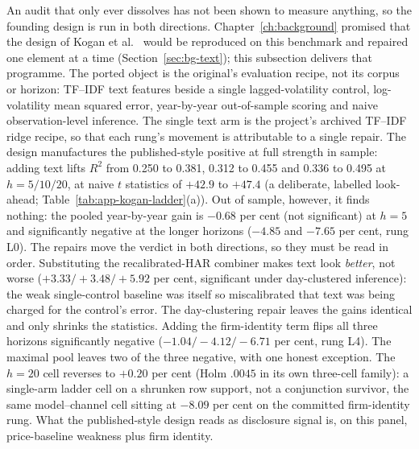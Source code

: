 An audit that only ever dissolves has not been shown to measure anything, so the founding design is run in both directions. Chapter~\ref{ch:background} promised that the design of Kogan et al.~\cite{kogan2009predicting} would be reproduced on this benchmark and repaired one element at a time (Section~\ref{sec:bg-text}); this subsection delivers that programme. The ported object is the original's evaluation recipe, not its corpus or horizon: TF--IDF text features beside a single lagged-volatility control, log-volatility mean squared error, year-by-year out-of-sample scoring and naive observation-level inference. The single text arm is the project's archived TF--IDF ridge recipe, so that each rung's movement is attributable to a single repair. %
The design manufactures the published-style positive at full strength in sample: adding text lifts $R^2$ from 0.250 to 0.381, 0.312 to 0.455 and 0.336 to 0.495 at $h{=}5/10/20$, at naive $t$ statistics of $+42.9$ to $+47.4$ (a deliberate, labelled look-ahead; Table~\ref{tab:app-kogan-ladder}(a)). %
Out of sample, however, it finds nothing: the pooled year-by-year gain is $-0.68$ per cent (not significant) at $h{=}5$ and significantly negative at the longer horizons ($-4.85$ and $-7.65$ per cent, rung L0). %
The repairs move the verdict in both directions, so they must be read in order. Substituting the recalibrated-HAR combiner makes text look \emph{better}, not worse ($+3.33/+3.48/+5.92$ per cent, significant under day-clustered inference): the weak single-control baseline was itself so miscalibrated that text was being charged for the control's error. The day-clustering repair leaves the gains identical and only shrinks the statistics. %
Adding the firm-identity term flips all three horizons significantly negative ($-1.04/-4.12/-6.71$ per cent, rung L4). %
The maximal pool leaves two of the three negative, with one honest exception. The $h{=}20$ cell reverses to $+0.20$ per cent (Holm $.0045$ in its own three-cell family): a single-arm ladder cell on a shrunken row support, not a conjunction survivor, the same model--channel cell sitting at $-8.09$ per cent on the committed firm-identity rung. %
What the published-style design reads as disclosure signal is, on this panel, price-baseline weakness plus firm identity.


